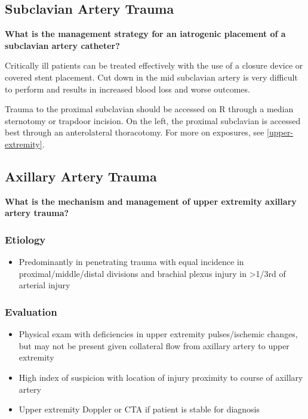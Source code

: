 \documentclass[
]{book}
\providecommand{\tightlist}{%
  \setlength{\itemsep}{0pt}\setlength{\parskip}{0pt}}
\begin{document}
\hypertarget{subclavian-artery-trauma}{%
\subsection{Subclavian Artery Trauma}\label{subclavian-artery-trauma}}

\textbf{What is the management strategy for an iatrogenic placement of a
subclavian artery catheter?}

Critically ill patients can be treated effectively with the use of a
closure device or covered stent placement.\citep{yoon2015, tran2009, cohen2014} Cut down in the mid subclavian artery is very difficult to
perform and results in increased blood loss and worse outcomes.

Trauma to the proximal subclavian should be accessed on R through a
median sternotomy or trapdoor incision. On the left, the proximal
subclavian is accessed best through an anterolateral thoracotomy. For
more on exposures, see \ref{upper-extremity}.

\hypertarget{axillary-artery-trauma}{%
\subsection{Axillary Artery Trauma}\label{axillary-artery-trauma}}

\textbf{What is the mechanism and management of upper extremity axillary
artery trauma?}

\hypertarget{etiology-5}{%
\subsubsection{Etiology}\label{etiology-5}}

\begin{itemize}
\tightlist
\item
  Predominantly in penetrating trauma with equal incidence in
  proximal/middle/distal divisions and brachial plexus injury in
  \textgreater1/3rd of arterial injury
\end{itemize}

\hypertarget{evaluation-6}{%
\subsubsection{Evaluation}\label{evaluation-6}}

\begin{itemize}
\item
  Physical exam with deficiencies in upper extremity pulses/ischemic
  changes, but may not be present given collateral flow from axillary
  artery to upper extremity
\item
  High index of suspicion with location of injury proximity to course
  of axillary artery
\item
  Upper extremity Doppler or CTA if patient is stable for diagnosis
\end{itemize}
\end{document}

